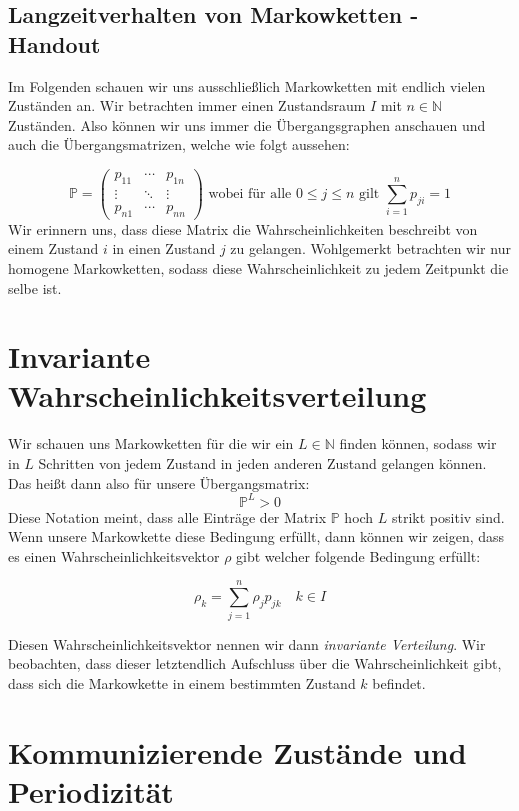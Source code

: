 \documentclass[a4paper]{article}
\begin{document}
\begin{center}
	\section*{Langzeitverhalten von Markowketten - Handout}
\end{center}

Im Folgenden schauen wir uns ausschließlich Markowketten mit endlich vielen Zuständen an.
Wir betrachten immer einen Zustandsraum $I$ mit $n \in \mathbb{N}$ Zuständen.
Also können wir uns immer die Übergangsgraphen anschauen und auch die Übergangsmatrizen,
welche wie folgt aussehen:

\[
\mathbb{P} = \begin{pmatrix} 
	p_{11} & \cdots & p_{1n} \\
	\vdots & \ddots & \vdots \\
	p_{n1} & \cdots & p_{nn}
\end{pmatrix} 
\text{ wobei für alle $0 \leq j \leq n$ gilt }
\sum_{i=1}^{n} p_{ji} = 1
\]
Wir erinnern uns, dass diese Matrix die Wahrscheinlichkeiten beschreibt von einem Zustand $i$ in einen
Zustand $j$ zu gelangen. Wohlgemerkt betrachten wir nur homogene Markowketten, sodass diese Wahrscheinlichkeit
zu jedem Zeitpunkt die selbe ist.

\section{Invariante Wahrscheinlichkeitsverteilung}
Wir schauen uns Markowketten für die wir ein $L \in \mathbb{N}$ finden können, sodass
wir in $L$ Schritten von jedem Zustand in jeden anderen Zustand gelangen können.
Das heißt dann also für unsere Übergangsmatrix:
\[
\mathbb{P} ^{L} > 0
\] 
Diese Notation meint, dass alle Einträge der Matrix $\mathbb{P}$ hoch $L$ strikt positiv sind.
Wenn unsere Markowkette diese Bedingung erfüllt, dann können wir zeigen, dass es einen
Wahrscheinlichkeitsvektor $\rho$ gibt welcher folgende Bedingung erfüllt:

\[
\rho_k = \sum_{j=1}^{n} \rho_j p_{jk} \quad k \in I
\]

Diesen Wahrscheinlichkeitsvektor nennen wir dann \textit{invariante Verteilung}.
Wir beobachten, dass dieser letztendlich Aufschluss über die Wahrscheinlichkeit gibt, dass sich die
Markowkette in einem bestimmten Zustand $k$ befindet.

\section{Kommunizierende Zustände und Periodizität}
\end{document}
